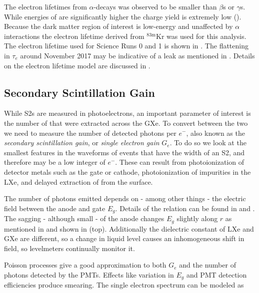 The electron lifetimes from $\alpha$-decays was observed to be smaller than $\beta$s or $\gamma$s.  While energies of \alphadecays are
significantly higher the charge yield is extremely low ().  Because the dark matter region of
interest is low-energy and unaffected by $\alpha$ interactions the electron lifetime derived from $\mathrm{^{83m}Kr}$ was used for this
analysis.  The
electron lifetime used for Science Runs 0 and 1 is shown in .  The flattening in $\tau_{e}$
around November 2017 may be indicative of a leak as mentioned in .  Details on the
electron lifetime model are discussed in .



\subsection{Secondary Scintillation Gain}
\label{subsec:det_char_single_electron_gain}
While S2s are measured in photoelectrons, an important parameter of
interest is the number of \electron that were extracted across the GXe.  To convert between the two we need to measure the number of
detected photons per $e^-$, also known as the \textit{secondary scintillation gain}, or \textit{single electron gain} $G_e$.  To do so we
look at the
smallest features in the waveforms of events that have the width of an S2, and therefore may be a low integer of $e^-$.  These can
result
from photoionization of detector metals such as the gate or cathode, photoionization of impurities in the LXe, and delayed extraction
of \electron from the surface.

The number of photons emitted depends on - among other things - the electric field between the anode and gate $E_g$.  Details of the
relation can be found in  and .  The sagging - although small - of the
anode changes $E_g$ slightly along $r$ as mentioned in  and shown in
 (top).  Additionally the dielectric constant of LXe and GXe are different, so a change in liquid level
causes an inhomogeneous shift in field, so levelmeters continually monitor it.

Poisson processes give a good approximation to both $G_e$ and the number of photons detected by the PMTs.  Effects like variation in $E_g$
and PMT detection efficiencies produce smearing.  The single electron spectrum can be modeled as

